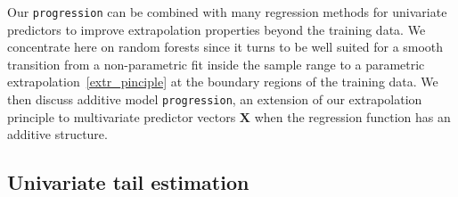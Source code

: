 \documentclass{statsoc}
\theoremstyle{break}
\begin{document}
Our \texttt{progression} can be combined with many regression methods for univariate predictors to improve extrapolation properties beyond the training data. 
We concentrate here on random forests since it turns to be well suited 
for a smooth transition from a non-parametric fit inside the sample range to a parametric extrapolation~\eqref{extr_pinciple} at the boundary regions of the training data.
We then discuss additive model \texttt{progression}, an extension of our extrapolation principle to multivariate predictor vectors $\mathbf X$ when 
the regression function has an additive structure.

\subsection{Univariate tail estimation}\label{sec:stat_univariate}
\end{document}
